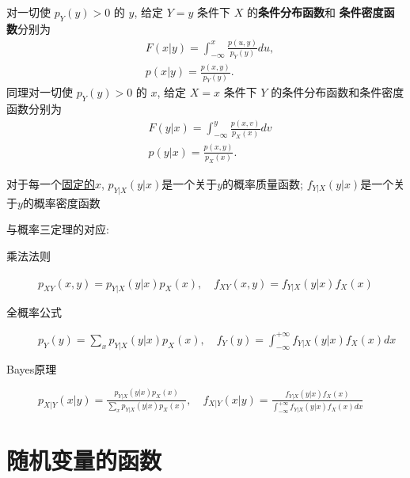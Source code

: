 \begin{definition}
	对一切使 $p_Y(y)>0$ 的 $y$, 给定 $Y=y$ 条件下 $X$ 的\textbf{条件分布函数}和
	\textbf{条件密度函数}分别为
	\begin{align}
		 & F(x | y)=\int_{-\infty}^{x} \frac{p(u, y)}{p_{Y}(y)} du,  \\
		 & p(x | y)=\frac{p(x, y)}{p_{Y}(y)}.
	\end{align}
	同理对一切使 $p_Y(y)>0$ 的 $x$, 给定 $X=x$ 条件下 $Y$ 的条件分布函数和条件密度函数分别为
	\begin{align}
		 & F(y | x)=\int_{-\infty}^{y} \frac{p(x, v)}{p_{X}(x)} dv  \\
		 & p(y | x)=\frac{p(x, y)}{p_{X}(x)}.
	\end{align}
\end{definition}

\begin{remark}
    对于每一个\underline{固定的$x$}, $p_{Y|X}(y|x)$是一个关于$y$的概率质量函数; $f_{Y|X}(y|x)$是一个关于$y$的概率密度函数
\end{remark}

与概率三定理的对应:
\begin{description}
    \item[乘法法则] $p_{XY}(x,y)=p_{Y|X}(y|x)p_{X}(x), \quad f_{XY}(x,y)=f_{Y|X}(y|x)f_{X}(x)$
    \item[全概率公式] $p_{Y}(y)=\sum_{x}p_{Y|X}(y|x)p_{X}(x), \quad f_{Y}(y)=\int^{+\infty}_{-\infty}f_{Y|X}(y|x)f_{X}(x)dx$
    \item[Bayes原理]  $p_{X|Y}(x|y)=\frac{p_{Y|X}(y|x)p_{X}(x)}{\sum_{x}p_{Y|X}(y|x)p_{X}(x)}, \quad f_{X|Y}(x|y)=\frac{f_{Y|X}(y|x)f_{X}(x)}{\int^{+\infty}_{-\infty}f_{Y|X}(y|x)f_{X}(x)dx}$
\end{description}

\section{随机变量的函数}

